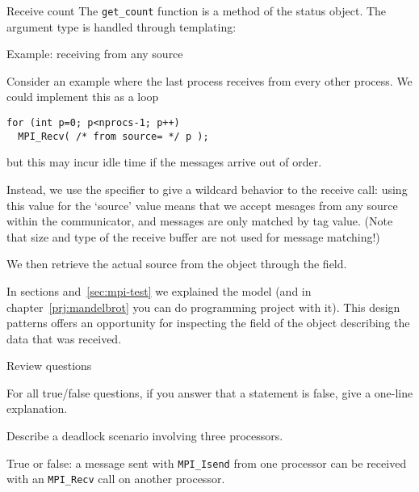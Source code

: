 \begin{mplnote}{Receive count}
  The \lstinline+get_count+ function is a method of the status object.
  The argument type is handled through templating:
\end{mplnote}

 {Example: receiving from any source}

Consider an example where the last process receives from every other process.
We could implement this as a loop
\begin{lstlisting}
for (int p=0; p<nprocs-1; p++)
  MPI_Recv( /* from source= */ p );
\end{lstlisting}
but this may incur idle time if the messages arrive out of order.

Instead, we use the   specifier to give a wildcard
behavior to the receive call: using this value for the `source' value
means that we accept mesages from any source within the communicator,
and messages are only matched by tag value.
(Note that size and type of the receive buffer are not used for message matching!)

We then retrieve the
actual source from the  object through the
 field.
%
%

In sections and~\ref{sec:mpi-test} we explained
the  model
(and in chapter~\ref{prj:mandelbrot} you can do programming project with it).
This design patterns offers an opportunity for inspecting the
 field of the 
object describing the data that was received.


 {Review questions}

For all true/false questions, if you answer that a statement is false,
give a one-line explanation.

\begin{review}
  Describe a deadlock scenario involving three processors.
\end{review}

\begin{review}
  True or false: a message sent with \lstinline{MPI_Isend} from one processor can be
  received with an \lstinline{MPI_Recv} call on another processor.
\end{review}

